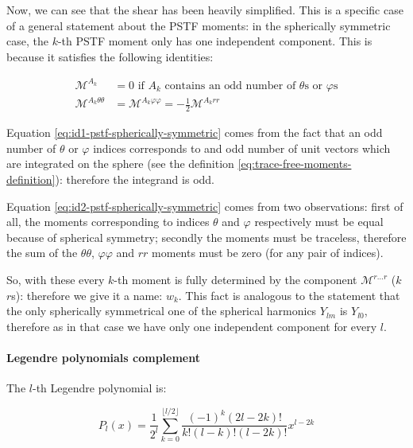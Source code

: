 \documentclass[main.tex]{subfiles}
\begin{document}
Now, we can see that the shear has been heavily simplified. This is a specific case of a general statement about the PSTF moments: in the spherically symmetric case, the \(k\)-th PSTF moment only has one independent component. This is because it satisfies the following identities:

\begin{subequations}
\begin{align}
  \mathscr M ^{A_k} &= 0 \text{ if } A_k \text{ contains an odd number of } \theta \text{s or } \varphi \text{s}  \label{eq:id1-pstf-spherically-symmetric}  \\
  \mathscr M ^{A_k \theta \theta} &= \mathscr M ^{A_k \varphi \varphi} = -\frac{1}{2} \mathscr M ^{A_k rr} \label{eq:id2-pstf-spherically-symmetric}
\end{align}
\end{subequations}

Equation \eqref{eq:id1-pstf-spherically-symmetric}  comes from the fact that an odd number of \(\theta\) or \(\varphi\) indices corresponds to and odd number of unit vectors which are integrated on the sphere (see the definition \eqref{eq:trace-free-moments-definition}): therefore the integrand is odd.

Equation \eqref{eq:id2-pstf-spherically-symmetric} comes from two observations:
first of all, the moments corresponding to indices \(\theta\) and \(\varphi\) respectively must be equal because of spherical symmetry; secondly the moments must be traceless, therefore the sum of the \(\theta \theta\), \(\varphi \varphi\) and \(rr\) moments must be zero (for any pair of indices).

So, with these every \(k\)-th moment is fully determined by the component \(\mathscr M ^{r\dots r}\) (\(k\) \(r\)s): therefore we give it a name: \(w_k\).
This fact is analogous to the statement that the only spherically symmetrical one of the spherical harmonics \(Y_{lm}\) is \(Y_{l0}\), therefore as in that case we have only one independent component for every \(l\).

\paragraph{Legendre polynomials complement}

The \(l\)-th Legendre polynomial is:

\begin{equation} \label{eq:legendre-polynomials}
    P_{l}(x)=\frac{1}{2^{l}} \sum_{k=0}^{\lfloor l / 2\rfloor} \frac{(-1)^{k}(2 l-2 k) !}{k !(l-k) !(l-2 k) !} x^{l-2 k}
\end{equation}
\end{document}
